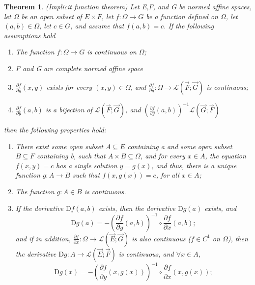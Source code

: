 \documentclass[a4paper,12pt]{report}
\newtheorem{theorem}{Theorem}[section]
\begin{document}
\begin{theorem}
    (Implicit function theorem) Let E,F, and G be normed affine spaces, let $\Omega$ be an open subset of $E\times F$, let $f:\Omega\to G$ be a function defined on $\Omega$, let $(a,b)\in \Omega$, let $c\in G$, and assume that $f(a,b)=c$. If the following assumptions hold
    \begin{enumerate}[label={(\arabic*)}]
        \item The function $f:\Omega\to G$ is continuous on $\Omega$;
        \item F and G are complete normed affine space
        \item $\frac{\partial f}{\partial y}(x,y)$ exists for every $(x,y)\in \Omega$, and $\frac{\partial f}{\partial y}:\Omega\to\mathcal L (\vec F;\vec G)$ is continuous;
        \item $\frac{\partial f}{\partial y}(a,b)$ is a bijection of $\mathcal L (\vec F;\vec G)$, and $\left(\frac{\partial f}{\partial y}(a,b)\right)^{-1} \mathcal L (\vec G;\vec F)$
    \end{enumerate}
    then the following properties hold:
    \begin{enumerate}[label={(\alph*)}]
        \item There exist some open subset $A\subseteq E$ containing a and some open subset $B\subseteq F$ containing b, such that $A\times B\subseteq \Omega$, and for every $x\in A$, the equation $f(x,y)=c$ has a single solution $y=g(x)$, and thus, there is a unique function $g:A\to B$ such that $f(x,g(x))=c$, for all $x\in A$;
        \item The function $g:A\in B$ is continuous.
        \item If the derivative $\mathrm D f(a,b)$ exists, then the derivative $\mathrm D g(a)$ exists, and 
            \[
                \mathrm D g(a)=-\left( \frac{\partial f}{\partial y} (a,b)\right)^{-1} \circ \frac{\partial f}{\partial x} (a,b);
            \]
            and if in addition, $\frac{\partial f}{\partial x}:\Omega\to\mathcal L (\vec E;\vec G)$ is also continuous ($f\in C^1$ on $\Omega$), then the derivative $\mathrm D g:A\to \mathcal L (\vec E; \vec F)$ is continuous, and $\forall x\in A$, 
            \[
                \mathrm D g(x)=-\left( \frac{\partial f}{\partial y} (x,g(x))\right)^{-1} \circ \frac{\partial f}{\partial x} (x,g(x));
            \]

    \end{enumerate}
\end{theorem}
\end{document}
